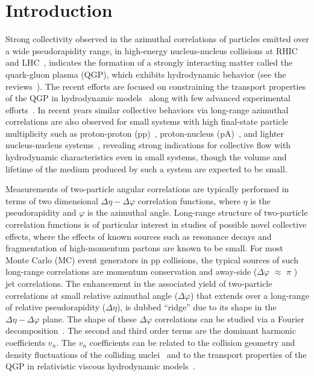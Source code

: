 
\section{Introduction}
\label{sec:intro}

Strong collectivity observed in the azimuthal correlations of particles emitted over a wide pseudorapidity range, in high-energy nucleus-nucleus collisions at RHIC~\cite{Adams:2005dq,Adcox:2004mh,Arsene:2004fa,Back:2004je} and LHC~\cite{Abelev:2012di, Abelev:2014pua, ATLAS:2011ah}, indicates the formation of a strongly interacting matter called the quark-gluon plasma (QGP), which exhibits hydrodynamic behavior (see the reviews~\cite{Romatschke:2007mq,Jeon:2015dfa,Romatschke:2017ejr}). The recent efforts are focused on constraining the transport properties of the QGP in hydrodynamic models~\cite{Niemi:2015qia,Bernhard:2016tnd,Bernhard2019} along with few advanced experimental efforts~\cite{ALICE:2016kpq,Acharya:2017gsw,Acharya:2017zfg,Acharya:2020taj}.
In recent years similar collective behaviors via long-range azimuthal correlations are also observed for small systems with high final-state particle multiplicity such as proton-proton (pp)~\cite{Aad:2015gqa,Khachatryan:2015lva,Khachatryan:2016txc,Acharya:2019vdf}, proton-nucleus (pA)~\cite{Abelev:2012ola,Aad:2014lta,Aaboud:2016yar,Khachatryan:2016ibd}, and lighter nucleus-nucleus systems~\cite{PHENIX:2018lia,Aidala:2017ajz}, revealing strong indications for collective flow with hydrodynamic characteristics even in small systems, though the volume and lifetime of the medium produced by such a system are expected to be small. 

Measurements of two-particle angular correlations are typically performed in terms of two dimensional $\Delta\eta-\Delta\varphi$ correlation functions, where $\eta$ is the pseudorapidity and $\varphi$ is the azimuthal angle. Long-range structure of two-particle correlation functions is of particular interest in studies of possible novel collective effects, where the effects of known sources such as resonance decays and fragmentation of high-momentum partons are known to be small. For most Monte Carlo (MC) event generators in pp collisions, the typical sources of such long-range correlations are momentum conservation and away-side ($\Delta\varphi$ $\approx$ $\pi$ ) jet correlations.
The enhancement in the associated yield of two-particle correlations at small relative azimuthal angle ($\Delta\varphi$) that extends over a long-range of relative pseudorapidity ($\Delta\eta$), is dubbed ``ridge'' due to its shape in the $\Delta\eta-\Delta\varphi$ plane.
The shape of these $\Delta\varphi$ correlations can be studied via a Fourier decomposition~\cite{Poskanzer:1998yz,Voloshin:2008dg}. The second and third order terms are the dominant harmonic coefficients $v_n$. The $v_n$ coefficients can be related to the collision geometry and density fluctuations of the colliding nuclei~\cite{Alver:2010gr,Alver:2010dn,ALICE:2011ab} and to the transport properties of the QGP in relativistic viscous hydrodynamic models~\cite{Gale:2012rq,Niemi:2015qia,Shen:2014vra,Bernhard:2016tnd,Bernhard2019}.

